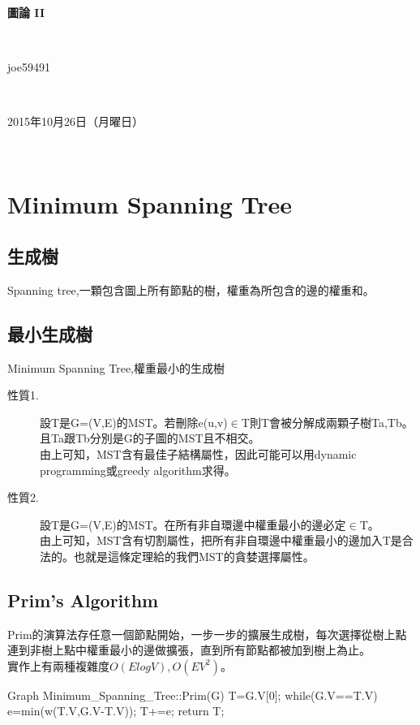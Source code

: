 \documentclass{article}
\title{\hmwkClass}
\author{\hmwkAuthorName}
\date{\hmwkDueDate}
\def\normalsize{\fontsize{12}{16}\selectfont}
\def\large{\fontsize{16}{24}\selectfont}
\def\LARGE{\fontsize{24}{36}\selectfont}
\newcommand{\hmwkDueDate}{2015年10月26日（月曜日）} %
\newcommand{\hmwkClass}{圖論 II} %
\newcommand{\hmwkAuthorName}{joe59491} %
\begin{document}
\LARGE~\\[4ex]
\centerline{\bf\hmwkClass}\large\\[2ex]\centerline{\hmwkAuthorName}\\[2ex]\centerline{\hmwkDueDate}\\
\normalsize



\section{Minimum Spanning Tree}
\subsection{生成樹}
Spanning tree,一顆包含圖上所有節點的樹，權重為所包含的邊的權重和。
\subsection{最小生成樹}
Minimum Spanning Tree,權重最小的生成樹
\begin{description}
\item[ 性質1.]設T是G=(V,E)的MST。若刪除e(u,v)$\in $T則T會被分解成兩顆子樹Ta,Tb。且Ta跟Tb分別是G的子圖的MST且不相交。\\
由上可知，MST含有最佳子結構屬性，因此可能可以用dynamic programming或greedy algorithm求得。
\item[ 性質2.]設T是G=(V,E)的MST。在所有非自環邊中權重最小的邊必定$\in $T。\\
由上可知，MST含有切割屬性，把所有非自環邊中權重最小的邊加入T是合法的。也就是這條定理給的我們MST的貪婪選擇屬性。
\end{description}
\subsection{Prim's Algorithm}
Prim的演算法存任意一個節點開始，一步一步的擴展生成樹，每次選擇從樹上點連到非樹上點中權重最小的邊做擴張，直到所有節點都被加到樹上為止。\\
實作上有兩種複雜度$O(ElogV),O(EV^2)$。
\newpage
\begin{algorithm}[caption={Prim's Algorithm}, label={alg1}]
Graph Minimum_Spanning_Tree::Prim(G)
    T=G.V[0];
    while(G.V==T.V)
        e=min(w(T.V,G.V-T.V));
        T+=e;
    return T;
\end{algorithm}
\end{document}
